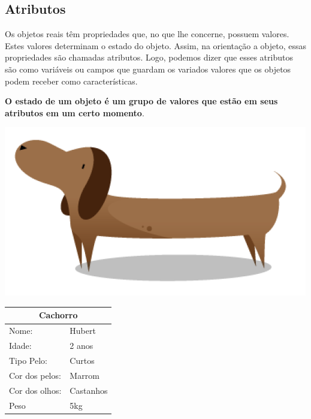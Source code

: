 \subsection{Atributos}

Os objetos reais têm propriedades que, no que lhe concerne, possuem valores. 
Estes valores determinam o estado do objeto. Assim, na orientação a objeto, 
essas propriedades são chamadas atributos. Logo, podemos dizer que esses atributos são como variáveis ou campos que guardam os variados valores que os objetos podem receber como características.

\textbf{O estado de um objeto é um grupo de valores que estão em seus atributos em um certo momento}. \\

\begin{minipage}{\textwidth}
  \begin{minipage}[b]{0.49\textwidth}
    \centering
    \includegraphics[scale=0.4]{imagens/cachorro-objeto.png}
    \label{fig:cachorro-objeto-1}
  \end{minipage}
  \hfill
  \begin{minipage}[b]{0.52\textwidth}
    \centering
    \begin{tabular}{|l|l|}
      \hline
      \multicolumn{2}{|c|}{Cachorro}      \\ \hline
        Nome:                 & Hubert    \\ \hline
        Idade:                & 2 anos    \\ \hline
        Tipo Pelo:            & Curtos    \\ \hline
        Cor dos pelos:        & Marrom    \\ \hline
        Cor dos olhos:        & Castanhos \\ \hline
        Peso                  & 5kg       \\ \hline
      \end{tabular}
    \end{minipage}
  \end{minipage} \\

